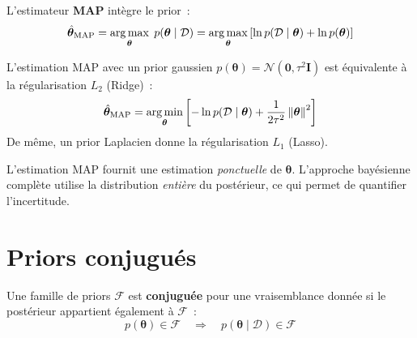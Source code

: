 \begin{definition}
L'estimateur \textbf{MAP} int\`egre le prior~:
\begin{equation}
  \hat{\bm{\theta}}_{\text{MAP}} = \operatorname*{arg\,max}_{\bm{\theta}}\;
  p(\bm{\theta} \mid \mathcal{D}) = \operatorname*{arg\,max}_{\bm{\theta}}
  \left[\ln p(\mathcal{D} \mid \bm{\theta}) + \ln p(\bm{\theta})\right]
  \label{eq:map}
\end{equation}
\end{definition}

\begin{proposition}
L'estimation MAP avec un prior gaussien $p(\bm{\theta}) =
\mathcal{N}(\bm{0}, \tau^2 \bm{I})$ est \'equivalente \`a la r\'egularisation
$L_2$ (Ridge)~:
\begin{equation}
  \hat{\bm{\theta}}_{\text{MAP}} = \operatorname*{arg\,min}_{\bm{\theta}} \left[
  -\ln p(\mathcal{D} \mid \bm{\theta}) + \frac{1}{2\tau^2}
  \left\| \bm{\theta} \right\|^2 \right]
\end{equation}
De m\^eme, un prior Laplacien donne la r\'egularisation $L_1$ (Lasso).
\end{proposition}

\begin{attention}[title=\textbf{MAP $\neq$ bay\'esien complet}]
L'estimation MAP fournit une estimation \emph{ponctuelle} de $\bm{\theta}$.
L'approche bay\'esienne compl\`ete utilise la distribution \emph{enti\`ere}
du post\'erieur, ce qui permet de quantifier l'incertitude.
\end{attention}

\section{Priors conjugu\'es}
\label{sec:conjugues}

\begin{definition}
Une famille de priors $\mathcal{F}$ est \textbf{conjugu\'ee} pour une
vraisemblance donn\'ee si le post\'erieur appartient \'egalement \`a
$\mathcal{F}$~:
\begin{equation}
  p(\bm{\theta}) \in \mathcal{F} \quad \Longrightarrow \quad
  p(\bm{\theta} \mid \mathcal{D}) \in \mathcal{F}
\end{equation}
\end{definition}

